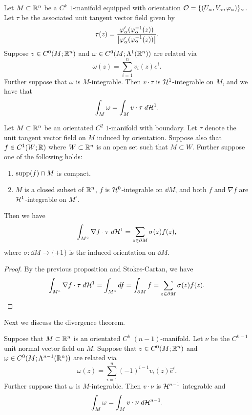 \documentclass[a4paper]{article}
\begin{document}
\begin{prop}
Let $M \subset \mathbb{R}^n$ be a $C^k$ $1$-manifold equipped with 
orientation $\mathcal{O} = \{(U_\alpha, V_\alpha, \varphi_\alpha)\}_\alpha$.
Let $\tau$ be the associated unit tangent vector field given by 
\[
\tau(z) = \frac{\varphi_\alpha'(\varphi_\alpha^{-1}(z))}
{\left\lvert \varphi_\alpha'(\varphi_\alpha^{-1}(z))\right\rvert}.
\] 
Suppose $v \in C^0(M; \mathbb{R}^n)$ and $\omega \in C^0 (M; \Lambda^1 
(\mathbb{R}^n))$ are related via 
\[
\omega(z) = \sum_{i=1}^n v_i(z) e^i.
\]
Further suppose that $\omega$ is $M$-integrable. 
Then $v \cdot \tau$ is $\mathcal{H}^1$-integrable on $M$, 
and we have that 
\[
\int_M \omega = \int_M v \cdot \tau \; d \mathcal{H}^1.
\]
\end{prop}

\begin{thm}
Let $M \subset \mathbb{R}^n$ be an orientated $C^2$ $1$-manifold
with boundary. Let $\tau$ denote the unit tangent
vector field on $M$ induced by orientation. Suppose also 
that $f \in C^1 (W; \mathbb{R})$ where $W \subset \mathbb{R}^n$ is an open set 
such that $M \subset W$. Further suppose one of the following 
holds: 
\begin{enumerate}
\item $\operatorname{supp}(f) \cap M$ is compact.
\item $M$ is a closed subset of $\mathbb{R}^n$, $f$ is $\mathcal{H}^0$-integrable
on $\dd M$, and both $f$ and $\nabla f$ are $\mathcal{H}^1$-integrable
on $M^\circ$.
\end{enumerate}
Then we have 
\[
\int_{M^\circ} \nabla f \cdot \tau \; d \mathcal{H}^1 
= \sum_{z \in \partial M} \sigma(z) f(z),
\]
where $\sigma : \dd M \to \{\pm 1\}$ is the induced
orientation on $\dd M$.
\end{thm}

\begin{proof}
By the previous proposition and Stokes-Cartan, we have 
\[
\int_{M^\circ} \nabla f \cdot \tau \; d \mathcal{H}^1 
= \int_{M^\circ} d f
= \int_{\partial M} f
= \sum_{z \in \partial M} \sigma(z) f(z).
\]
\end{proof}

Next we discuss the divergence theorem. 

\begin{prop}
Suppose that $M \subset \mathbb{R}^n$ is an orientated $C^k$
$(n-1)$-manifold. Let $\nu$ be the $C^{k-1}$ unit normal 
vector field on $M$. Suppose that $v \in C^0(M ; \mathbb{R}^n)$ and 
$\omega \in C^0(M; \Lambda^{n-1}(\mathbb{R}^n))$ are related via 
\[
\omega(z) = \sum_{i=1}^n (-1)^{i-1} v_i(z) \hat{e}^i.
\]
Further suppose that $\omega$ is $M$-integrable. Then 
$v \cdot \nu$ is $\mathcal{H}^{n-1}$ integrable and 
\[
\int_M \omega = \int_M v \cdot \nu \; d \mathcal{H}^{n-1}.
\]
\end{prop}
\end{document}
